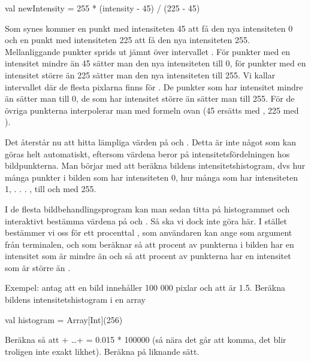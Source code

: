 \begin{Code}
val newIntensity = 255 * (intensity - 45) / (225 - 45)
\end{Code}

Som synes kommer en punkt med intensiteten 45 att få den nya intensiteten 0 och en punkt med intensiteten 225 att få den nya intensiteten 255. Mellanliggande punkter sprids ut jämnt över intervallet \code{[0, 255]}. För punkter med en intensitet mindre än 45 sätter man den nya intensiteten till 0, för punkter med en intensitet större än 225 sätter man den nya intensiteten till 255. Vi kallar intervallet där de flesta pixlarna finns för . De punkter som har intensitet mindre än  sätter man till 0, de som har intensitet större än  sätter man till 255. För de övriga punkterna interpolerar man med formeln ovan (45 ersätts med , 225 med ).

Det återstår nu att hitta lämpliga värden på  och . Detta är inte något som kan göras helt automatiskt, eftersom värdena beror på intensitetsfördelningen hos bildpunkterna. Man börjar med att beräkna bildens intensitetshistogram, dvs hur många punkter i bilden som har intensiteten 0, hur många som har intensiteten 1, . . . , till och med 255.

I de flesta bildbehandlingsprogram kan man sedan titta på histogrammet och interaktivt bestämma värdena på  och . Så ska vi dock inte göra här. I stället bestämmer vi oss för ett procenttal , som användaren kan ange som argument från terminalen, och som  beräknar  så att  procent av punkterna i bilden har en intensitet som är mindre än  och  så att  procent av punkterna har en intensitet som är större än .

Exempel: antag att en bild innehåller 100 000 pixlar och att  är 1.5. Beräkna bildens intensitetshistogram i en array
\begin{Code}
val histogram = Array[Int](256)
\end{Code}

Beräkna  så att  + \ldots +  = 0.015 * 100000 (så nära det går att komma, det blir troligen inte exakt likhet). Beräkna  på liknande sätt.

